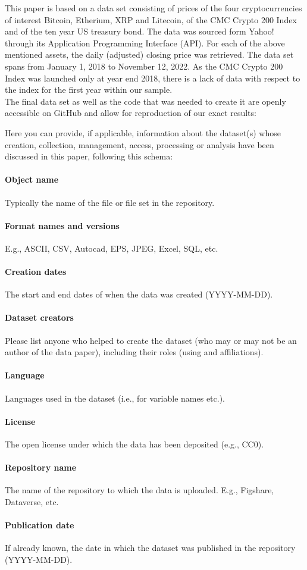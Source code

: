 This paper is based on a data set consisting of prices of the four cryptocurrencies of interest Bitcoin, Etherium, XRP and Litecoin, of the CMC Crypto 200 Index and of the ten year US treasury bond. The data was sourced form Yahoo! through its Application Programming Interface (API). For each of the above mentioned assets, the daily (adjusted) closing price was retrieved. The data set spans from January 1, 2018 to November 12, 2022. As the CMC Crypto 200 Index was launched only at year end 2018, there is a lack of data with respect to the index for the first year within our sample. 
\\
The final data set as well as the code that was needed to create it are openly accessible on GitHub and allow for reproduction of our exact results:


Here you can provide, if applicable, information about the dataset(s) whose creation, collection, management, access, processing or analysis have been discussed in this paper, following this schema:
\paragraph{Object name} Typically the name of the file or file set in the repository.
\paragraph{Format names and versions} E.g., ASCII, CSV, Autocad, EPS, JPEG, Excel, SQL, etc.
\paragraph{Creation dates} The start and end dates of when the data was created (YYYY-MM-DD).
\paragraph{Dataset creators} Please list anyone who helped to create the dataset (who may or may not be an author of the data paper), including their roles (using and affiliations).
\paragraph{Language} Languages used in the dataset (i.e., for variable names etc.).
\paragraph{License} The open license under which the data has been deposited (e.g., CC0). 
\paragraph{Repository name} The name of the repository to which the data is uploaded. E.g., Figshare, Dataverse, etc. 
\paragraph{Publication date} If already known, the date in which the dataset was published in the repository (YYYY-MM-DD).
